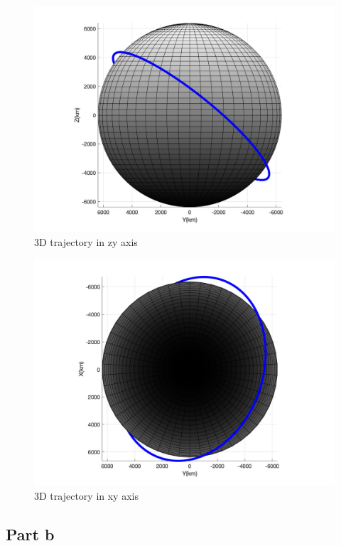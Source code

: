 \begin{figure}[H]
    \caption{3D trajectory in zy axis}
    \centering
    \includegraphics[width=16cm]{../Figure/Q2/yz_view}
\end{figure}

\begin{figure}[H]
    \caption{3D trajectory in xy axis}
    \centering
    \includegraphics[width=16cm]{../Figure/Q2/xy_view}
\end{figure}

\subsection{Part b}

